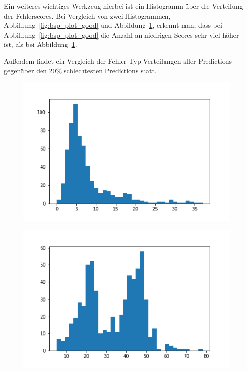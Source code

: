 \documentclass[pdftex,a4paper,halfparskip, article]{scrartcl}
\begin{document}
Ein weiteres wichtiges Werkzeug hierbei ist ein Histogramm über die Verteilung der Fehlerscores. Bei Vergleich von zwei Histogrammen, Abbildung~\ref{fig:bsp_plot_good} und Abbildung~\ref{fig:bsp_plot_bad}, erkennt man, dass bei Abbildung~\ref{fig:bsp_plot_good} die Anzahl an niedrigen Scores sehr viel höher ist, als bei Abbildung~\ref{fig:bsp_plot_bad}.

Außerdem findet ein Vergleich der Fehler-Typ-Verteilungen aller Predictions gegenüber den 20\% schlechtesten Predictions statt.


\begin{figure}
\centering
\begin{minipage}{.5\textwidth}
  \centering
  \includegraphics[width=.8\linewidth]{predictions_bin10_histogramm}
  \label{fig:bsp_plot_good}
\end{minipage}%
\begin{minipage}{.5\textwidth}
  \centering
  \includegraphics[width=.8\linewidth]{predictions_bin12_histogramm}
  \label{fig:bsp_plot_bad}
\end{minipage}
\end{figure}
\end{document}
